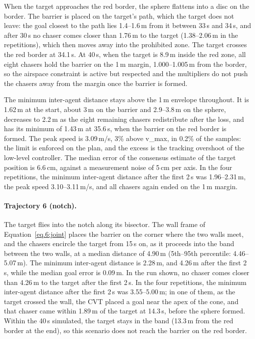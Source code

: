 When the target approaches the red border, the sphere flattens into a disc on the border. The barrier is placed on the target's path, which the target does not leave: the goal closest to the path lies 1.4--1.6\,m from it between 33\,s and 34\,s, and after 30\,s no chaser comes closer than 1.76\,m to the target (1.38--2.06\,m in the repetitions), which then moves away into the prohibited zone. The target crosses the red border at 34.1\,s. At 40\,s, when the target is 8.9\,m inside the red zone, all eight chasers hold the barrier on the 1\,m margin, 1.000--1.005\,m from the border, so the airspace constraint is active but respected and the multipliers do not push the chasers away from the margin once the barrier is formed.

The minimum inter-agent distance stays above the 1\,m envelope throughout. It is 1.62\,m at the start, about 3\,m on the barrier and 2.9--3.8\,m on the sphere, decreases to 2.2\,m as the eight remaining chasers redistribute after the loss, and has its minimum of 1.43\,m at 35.6\,s, when the barrier on the red border is formed. The peak speed is 3.09\,m/s, 3\% above \gls{v_max}, in 0.2\% of the samples: the limit is enforced on the plan, and the excess is the tracking overshoot of the low-level controller. The median error of the consensus estimate of the target position is 6.6\,cm, against a measurement noise of 5\,cm per axis. In the four repetitions, the minimum inter-agent distance after the first 2\,s was 1.96--2.31\,m, the peak speed 3.10--3.11\,m/s, and all chasers again ended on the 1\,m margin.

\paragraph{Trajectory 6 (notch).}
The target flies into the notch along its bisector. The wall frame of Equation~\eqref{eq.6:joint} places the barrier on the corner where the two walls meet, and the chasers encircle the target from 15\,s on, as it proceeds into the band between the two walls, at a median distance of 4.90\,m (5th--95th percentile: 4.46--5.07\,m). The minimum inter-agent distance is 2.28\,m, and 4.26\,m after the first 2\,s, while the median goal error is 0.09\,m. In the run shown, no chaser comes closer than 4.26\,m to the target after the first 2\,s. In the four repetitions, the minimum inter-agent distance after the first 2\,s was 3.55--5.00\,m; in one of them, as the target crossed the wall, the \gls{CVT} placed a goal near the apex of the cone, and that chaser came within 1.89\,m of the target at 14.3\,s, before the sphere formed. Within the 40\,s simulated, the target stays in the band (13.3\,m from the red border at the end), so this scenario does not reach the barrier on the red border.


